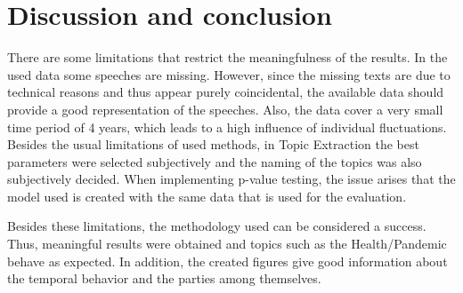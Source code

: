 \documentclass{article}
\begin{document}
\section{Discussion and conclusion}

There are some limitations that restrict the meaningfulness of the results. 
In the used data some speeches are missing.
However, since the missing texts are due to technical reasons and thus appear purely coincidental, the available data should provide a good representation of the speeches.
Also, the data cover a very small time period of 4 years, which leads to a high influence of individual fluctuations.
Besides the usual limitations of used methods, in Topic Extraction the best parameters were selected subjectively and the naming of the topics was also subjectively decided.
When implementing p-value testing, the issue arises that the model used is created with the same data that is used for the evaluation.

Besides these limitations, the methodology used can be considered a success. Thus, meaningful results were obtained and topics such as the Health/Pandemic behave as expected. 
In addition, the created figures give good information about the temporal behavior and the parties among themselves.

\end{document}
